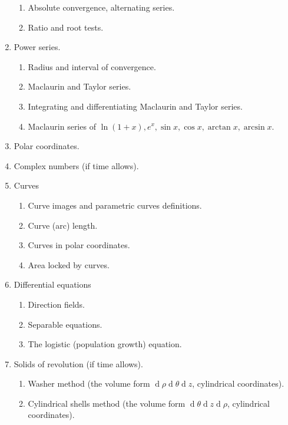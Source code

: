 \documentclass{article}
\begin{document}
\begin{enumerate}
\begin{enumerate}
\item Absolute convergence, alternating series.
\item Ratio and root tests.
\end{enumerate}
\item Power series.
\begin{enumerate}
\item Radius and interval of convergence.
\item Maclaurin and Taylor series.
\item Integrating and differentiating Maclaurin and Taylor series. 
\item Maclaurin series of $\ln(1+x), e^x, \sin x, \cos x, \arctan x, \arcsin x$.
\end{enumerate}
\item Polar coordinates.
\item Complex numbers (if time allows).
\item Curves
\begin{enumerate}
\item Curve images and parametric curves definitions.
\item Curve (arc) length.
\item Curves in polar coordinates.
\item Area locked by curves.
\end{enumerate}
\item Differential equations
\begin{enumerate}
\item Direction fields.
\item Separable equations.
\item The logistic (population growth) equation.
\end{enumerate}
\item Solids of revolution (if time allows).
\begin{enumerate}
\item Washer method (the volume form $\operatorname{d}\rho \operatorname{d}\theta \operatorname{d} z$, cylindrical coordinates).
\item Cylindrical shells method (the volume form $ \operatorname{d}\theta \operatorname{d} z \operatorname{d}\rho$, cylindrical coordinates).
\end{enumerate}
\end{enumerate}
\end{document}
